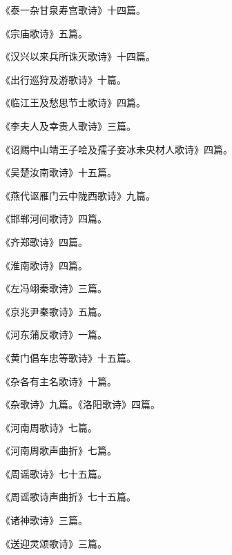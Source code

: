 \documentclass[12pt,UTF8]{ctexbook}
\begin{document}
《泰一杂甘泉寿宫歌诗》十四篇。



《宗庙歌诗》五篇。



《汉兴以来兵所诛灭歌诗》十四篇。



《出行巡狩及游歌诗》十篇。



《临江王及愁思节士歌诗》四篇。



《李夫人及幸贵人歌诗》三篇。



《诏赐中山靖王子哙及孺子妾冰未央材人歌诗》四篇。



《吴楚汝南歌诗》十五篇。



《燕代讴雁门云中陇西歌诗》九篇。



《邯郸河间歌诗》四篇。



《齐郑歌诗》四篇。



《淮南歌诗》四篇。



《左冯翊秦歌诗》三篇。



《京兆尹秦歌诗》五篇。



《河东蒲反歌诗》一篇。



《黄门倡车忠等歌诗》十五篇。



《杂各有主名歌诗》十篇。



《杂歌诗》九篇。《洛阳歌诗》四篇。



《河南周歌诗》七篇。



《河南周歌声曲折》七篇。



《周谣歌诗》七十五篇。



《周谣歌诗声曲折》七十五篇。



《诸神歌诗》三篇。



《送迎灵颂歌诗》三篇。
\end{document}
